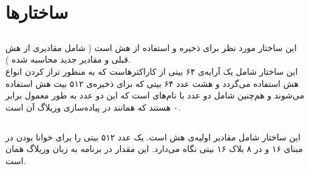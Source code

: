 \section{ \textbf{ساختارها}}

\subsection{}
\label{subsec:sph-skein-big-context}
این ساختار مورد نظر برای ذخیره و استفاده از هش است (‌ شامل مقادیری از هش قبلی و مقادیر جدید محاسبه شده ). \\ این ساختار شامل یک آرایه‌ی ۶۴ بیتی از کاراکترهاست که به منظور تراز کردن انواع هش استفاده می‌گردد و  هشت عدد ۶۴ بیتی  که برای ذخیره‌ی ۵۱۲ بیت هش  استفاده می‌شوند  و هم‌چنین شامل دو عدد با نام‌های  است که این دو عدد به طور معمول برابر ۰ هستند که همانند  در پیاده‌سازی وریلاگ آن است.



\subsection{}
\label{subsec:IV512}
این ساختار شامل مقادیر اولیه‌ی هش است. یک عدد ۵۱۲ بیتی را برای خوانا بودن در مبنای ۱۶ و در ۸ بلاک ۱۶ بیتی نگاه می‌دارد. این مقدار در برنامه‌ به زبان وریلاگ همان  است.
\subsection{}
\label{subsec:UBI-BIG}

